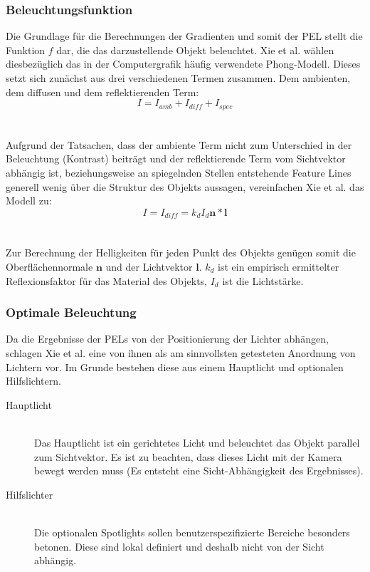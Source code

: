 \documentclass{paperStyle}
\begin{document}
\subsubsection{Beleuchtungsfunktion}
Die Grundlage für die Berechnungen der Gradienten und somit der PEL stellt die Funktion $f$ dar, die das darzustellende Objekt beleuchtet. 
Xie et al. wählen diesbezüglich das in der Computergrafik häufig verwendete Phong-Modell.
Dieses setzt sich zunächst aus drei verschiedenen Termen zusammen. Dem ambienten, dem diffusen und dem reflektierenden Term:
\begin{equation}
I = I_{amb} + I_{diff} + I_{spec}
\end{equation} 
\\\\
Aufgrund der Tatsachen, dass der ambiente Term nicht zum Unterschied in der Beleuchtung (Kontrast) beiträgt und der reflektierende Term vom Sichtvektor abhängig ist, beziehungsweise an spiegelnden Stellen entstehende Feature Lines generell wenig über die Struktur des Objekts aussagen, vereinfachen Xie et al. das Modell zu:
\begin{equation}
I = I_{diff} = k_{d}I_{d}\mathbf{n}*\mathbf{l}
\end{equation} 
\\\\
Zur Berechnung der Helligkeiten für jeden Punkt des Objekts genügen somit die Oberflächennormale $\mathbf{n}$ und der Lichtvektor $\mathbf{l}$. $k_{d}$ ist ein empirisch ermittelter Reflexionsfaktor für das Material des Objekts, $I_{d}$ ist die Lichtstärke.

\label{belfkt}
\subsubsection{Optimale Beleuchtung}
Da die Ergebnisse der PELs von der Positionierung der Lichter abhängen, schlagen Xie et al. eine von ihnen als am sinnvollsten getesteten Anordnung von Lichtern vor. Im Grunde bestehen diese aus einem Hauptlicht und optionalen Hilfslichtern.
\begin{description}
\item[Hauptlicht]\hfill \\ 
Das Hauptlicht ist ein gerichtetes Licht und beleuchtet das Objekt parallel zum Sichtvektor. Es ist zu beachten, dass dieses Licht mit der Kamera bewegt werden muss (Es entsteht eine Sicht-Abhängigkeit des Ergebnisses). \\
\item[Hilfslichter]\hfill \\
Die optionalen Spotlights sollen benutzerspezifizierte Bereiche besonders betonen. Diese sind lokal definiert und deshalb nicht von der Sicht abhängig.
\end{description}
\end{document}
